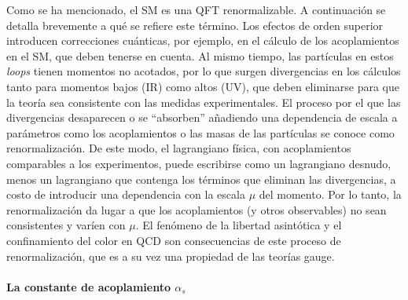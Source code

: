 Como se ha mencionado, el \ac{SM} es una \ac{QFT} renormalizable. A continuación se detalla brevemente a qué se refiere este término. Los efectos de orden superior introducen correcciones cuánticas, por ejemplo, en el cálculo de los acoplamientos en el \ac{SM}, que deben tenerse en cuenta. Al mismo tiempo, las partículas en estos \textit{loops} tienen momentos no acotados, por lo que surgen divergencias en los cálculos tanto para momentos bajos (\ac{IR}) como altos (\ac{UV}), que deben eliminarse para que la teoría sea consistente con las medidas experimentales. El proceso por el que las divergencias desaparecen o se \enquote{absorben} añadiendo una dependencia de escala a parámetros como los acoplamientos o las masas de las partículas se conoce como renormalización. De este modo, el lagrangiano física, con acoplamientos comparables a los experimentos, puede escribirse como un lagrangiano desnudo, menos un lagrangiano que contenga los términos que eliminan las divergencias, a costo de introducir una dependencia con la escala \(\mu\) del momento. Por lo tanto, la renormalización da lugar a que los acoplamientos (y otros observables) no sean consistentes y varíen con \(\mu\). El fenómeno de la libertad asintótica y el confinamiento del color en \ac{QCD} son consecuencias de este proceso de renormalización, que es a su vez una propiedad de las teorías gauge.

\paragraph{La constante de acoplamiento \(\alpha_s\)}

